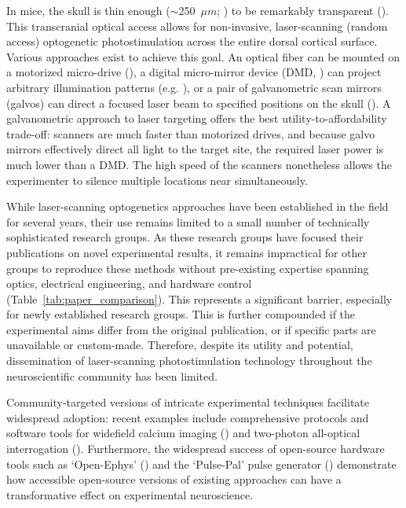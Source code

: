 \documentclass[9pt,lineno]{elife}
\begin{document}
In mice, the skull is thin enough ($\sim$250~$\mu m$; \citealp{Ghanbari2019Craniobot:Microsurgeries}) to be remarkably transparent (\citealp{Steinzeig2017ChronicMice}).
This transcranial optical access allows for non-invasive, laser-scanning (random access) optogenetic photostimulation across the entire dorsal cortical surface.
Various approaches exist to achieve this goal.
An optical fiber can be mounted on a motorized micro-drive (\citealp{Zatka-Haas2021SensoryDecision}), a digital micro-mirror device (DMD, \citealp{Allen2017ApplicationSignaling}) can project arbitrary illumination patterns (e.g. \citealp{Chong2020ManipulatingPerception}), or a pair of galvanometric scan mirrors (galvos) can direct a focused laser beam to specified positions on the skull (\citealp{Guo2014FlowMice,Li2016RobustPlanning,Heindorf2018MouseFeedback,Inagaki2018Low-dimensionalCortex,Pinto2019Task-DependentRegions,Keller2020FeedbackCortex,Esmaeili2021RapidResponse,Voitov2022CorticalMemory,Pinto2022MultipleCortex,Coen2023MouseDecisions,Gauld2025AActions}).
A galvanometric approach to laser targeting offers the best utility-to-affordability trade-off: scanners are much faster than motorized drives, and because galvo mirrors effectively direct all light to the target site, the required laser power is much lower than a DMD.
The high speed of the scanners nonetheless allows the experimenter to silence multiple locations near simultaneously.

While laser-scanning optogenetics approaches have been established in the field for several years, their use remains limited to a small number of technically sophisticated research groups.
As these research groups have focused their publications on novel experimental results, it remains impractical for other groups to reproduce these methods without pre-existing expertise spanning optics, electrical engineering, and hardware control (Table~\ref{tab:paper_comparison}).
This represents a significant barrier, especially for newly established research groups.
This is further compounded if the experimental aims differ from the original publication, or if specific parts are unavailable or custom-made.
Therefore, despite its utility and potential, dissemination of laser-scanning photostimulation technology throughout the neuroscientific community has been limited.

Community-targeted versions of  intricate experimental techniques facilitate widespread adoption: recent examples include comprehensive protocols and software tools for widefield calcium imaging (\citealp{Couto2021ChronicBehavior}) and two-photon all-optical interrogation (\citealp{Russell2022All-opticalMice}).
Furthermore, the widespread success of open-source hardware tools such as  `Open-Ephys' (\citealp{Siegle2017OpenElectrophysiology}) and the `Pulse-Pal' pulse generator (\citealp{Sanders2014ABehavior}) demonstrate how accessible open-source versions of existing approaches can have a transformative effect on experimental neuroscience.
\end{document}
